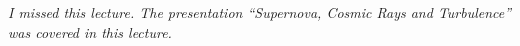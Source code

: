 \emph{I missed this lecture. The presentation ``Supernova, Cosmic Rays and Turbulence'' was covered in this lecture.}